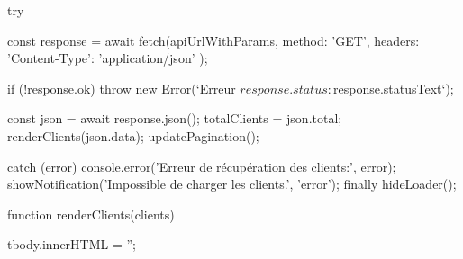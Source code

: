 {{        try {
            const response = await fetch(apiUrlWithParams, {
                method: 'GET',
                headers: { 'Content-Type': 'application/json' }
            });

            if (!response.ok) {
                throw new Error(`Erreur ${response.status}: ${response.statusText}`);
            }

            const json = await response.json();
            totalClients = json.total;
            renderClients(json.data);
            updatePagination();
        } catch (error) {
            console.error('Erreur de récupération des clients:', error);
            showNotification('Impossible de charger les clients.', 'error');
        } finally {
            hideLoader();
        }
    }

    function renderClients(clients) {
        tbody.innerHTML = '';

}}

